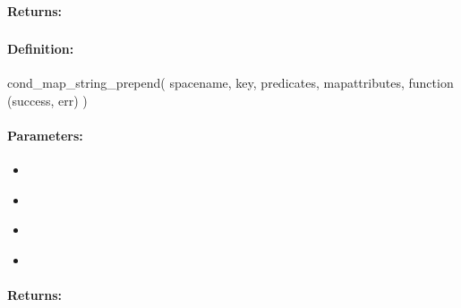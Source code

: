 \paragraph{Returns:}


\pagebreak
\subsubsection{}
\label{api:nodejs:cond_map_string_prepend}


\paragraph{Definition:}
\begin{javascriptcode}
cond_map_string_prepend(
        spacename, key, predicates, mapattributes, function (success, err) {})
\end{javascriptcode}
\paragraph{Parameters:}
\begin{itemize}[noitemsep]
\item {}\\

\item {}\\

\item {}\\

\item {}\\

\end{itemize}

\paragraph{Returns:}


\pagebreak
\subsubsection{}
\label{api:nodejs:group_map_string_prepend}



